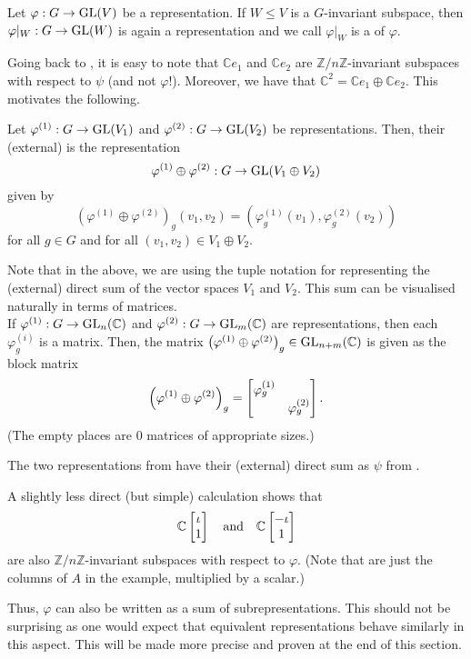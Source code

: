 \begin{defn}%
	Let $\varphi:G\to \operatorname{GL}(V)$ be a representation. If $W \le V$ is a $G$-invariant subspace, then $\varphi|_W : G \to \operatorname{GL}(W)$ is again a representation and we call $\varphi|_W$ is a  of $\varphi.$
\end{defn}

Going back to , it is easy to note that $\mathbb{C}e_1$ and $\mathbb{C}e_2$ are $\mathbb{Z}/n\mathbb{Z}$-invariant subspaces with respect to $\psi$ (and not $\varphi$!). Moreover, we have that $\mathbb{C}^2 = \mathbb{C}e_1 \oplus \mathbb{C}e_2.$ This motivates the following.

\begin{defn}%
	Let $\varphi^{(1)}:G \to \operatorname{GL}(V_1)$ and $\varphi^{(2)}:G \to \operatorname{GL}(V_2)$ be representations. Then, their (external)  is the representation
	\begin{equation*} 
		\varphi^{(1)}\oplus\varphi^{(2)} : G \to \operatorname{GL}(V_1 \oplus V_2)
	\end{equation*}
	given by
	\begin{equation*} 
		\left(\varphi^{(1)}\oplus\varphi^{(2)}\right)_g(v_1, v_2) = \left(\varphi^{(1)}_g(v_1), \varphi^{(2)}_g(v_2)\right)
	\end{equation*}
	for all $g \in G$ and for all $(v_1, v_2) \in V_1 \oplus V_2.$
\end{defn}
Note that in the above, we are using the tuple notation for representing the (external) direct sum of the vector spaces $V_1$ and $V_2.$ This sum can be visualised naturally in terms of matrices.\\
If $\varphi^{(1)}:G\to \operatorname{GL}_n(\mathbb{C})$ and $\varphi^{(2)}:G \to \operatorname{GL}_m(\mathbb{C})$ are representations, then each $\varphi^{(i)}_g$ is a matrix. Then, the matrix $\left(\varphi^{(1)} \oplus \varphi^{(2)}\right)_g \in \operatorname{GL}_{n + m}(\mathbb{C})$ is given as the block matrix
\begin{equation*} 
	\left(\varphi^{(1)} \oplus \varphi^{(2)}\right)_g = \begin{bmatrix} \varphi_g^{(1)} &  \\  & \varphi_g^{(2)} \end{bmatrix}.
\end{equation*}
(The empty places are $0$ matrices of appropriate sizes.)

\begin{ex}
	The two representations from  have their (external) direct sum as $\psi$ from .

	A slightly less direct (but simple) calculation shows that 
	\begin{equation*} 
		\mathbb{C}\begin{bmatrix} \iota \\ 1 \end{bmatrix} \quad\text{and}\quad \mathbb{C}\begin{bmatrix} -\iota \\ 1 \end{bmatrix}
	\end{equation*}
	are also $\mathbb{Z}/n\mathbb{Z}$-invariant subspaces with respect to $\varphi.$ (Note that are just the columns of $A$ in the example, multiplied by a scalar.)

	Thus, $\varphi$ can also be written as a sum of subrepresentations. This should not be surprising as one would expect that equivalent representations behave similarly in this aspect. This will be made more precise and proven at the end of this section.
\end{ex}

